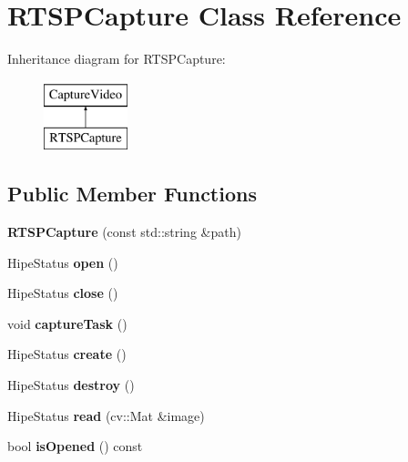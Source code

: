 \hypertarget{class_r_t_s_p_capture}{}\section{R\+T\+S\+P\+Capture Class Reference}
\label{class_r_t_s_p_capture}
Inheritance diagram for R\+T\+S\+P\+Capture\+:\begin{figure}[H]
\begin{center}
\leavevmode
\includegraphics[height=2.000000cm]{d5/dc1/class_r_t_s_p_capture}
\end{center}
\end{figure}
\subsection*{Public Member Functions}
\begin{DoxyCompactItemize}
\item 
\mbox{\label{class_r_t_s_p_capture_a84af1975f7d984d46cbe4338489c0769}} 
{\bfseries R\+T\+S\+P\+Capture} (const std\+::string \&path)
\item 
\mbox{\label{class_r_t_s_p_capture_acbb1b142c935e02a9d95533e56b0a8e8}} 
Hipe\+Status {\bfseries open} ()
\item 
\mbox{\label{class_r_t_s_p_capture_aecc20ea4c1b7924b41275fd45ec22e7e}} 
Hipe\+Status {\bfseries close} ()
\item 
\mbox{\label{class_r_t_s_p_capture_ab9f0319902b9884e3c91678eaecf19b4}} 
void {\bfseries capture\+Task} ()
\item 
\mbox{\label{class_r_t_s_p_capture_a7938b05ccd3211c6365435ca12fbcddb}} 
Hipe\+Status {\bfseries create} ()
\item 
\mbox{\label{class_r_t_s_p_capture_a1ae48b3c3f11e8c0da741cbd16532b3c}} 
Hipe\+Status {\bfseries destroy} ()
\item 
\mbox{\label{class_r_t_s_p_capture_a978c01fbe74a6bf65d75222dfcd29540}} 
Hipe\+Status {\bfseries read} (cv\+::\+Mat \&image)
\item 
\mbox{\label{class_r_t_s_p_capture_a20631eaff5db714d56ac57f92de1682b}} 
bool {\bfseries is\+Opened} () const
\end{DoxyCompactItemize}
